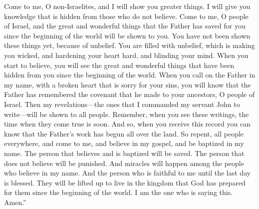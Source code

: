 Come to me, O non-Israelites, and I will show you greater things. I will give you knowledge that is hidden from those who do not believe.
\bverse \iffalse Come unto me, O ye house of Israel, and it shall be made manifest unto you how great things the Father hath laid up for you, from the foundation of the world; and it hath not come unto you, because of unbelief. \fi
Come to me, O people of Israel, and the great and wonderful things that the Father has saved for you since the beginning of the world will be shown to you. You have not been shown these things yet, because of unbelief.
\bverse \iffalse Behold, when ye shall rend that veil of unbelief which doth cause you to remain in your awful state of wickedness, and hardness of heart, and blindness of mind, then shall the great and marvelous things which have been hid up from the foundation of the world from you--yea, when ye shall call upon the Father in my name, with a broken heart and a contrite spirit, then shall ye know that the Father hath remembered the covenant which he made unto your fathers, O house of Israel. \fi
You are filled with unbelief, which is making you wicked, and hardening your heart hard, and blinding your mind. When you start to believe, you will see the great and wonderful things that have been hidden from you since the beginning of the world. When you call on the Father in my name, with a broken heart that is sorry for your sins, you will know that the Father has remembered the covenant that he made to your ancestors, O people of Israel.
\bverse \iffalse And then shall my revelations which I have caused to be written by my servant John be unfolded in the eyes of all the people. Remember, when ye see these things, ye shall know that the time is at hand that they shall be made manifest in very deed. \fi
Then my revelations---the ones that I commanded my servant John to write---will be shown to all people. Remember, when you see these writings, the time when they come true is soon.
\bverse \iffalse Therefore, when ye shall receive this record ye may know that the work of the Father has commenced upon all the face of the land. \fi
And so, when you receive this record you can know that the Father's work has begun all over the land.
\bverse \iffalse Therefore, repent all ye ends of the earth, and come unto me, and believe in my gospel, and be baptized in my name; for he that believeth and is baptized shall be saved; but he that believeth not shall be damned; and signs shall follow them that believe in my name. \fi
So repent, all people everywhere, and come to me, and believe in my gospel, and be baptized in my name. The person that believes and is baptized will be saved. The person that does not believe will be punished. And miracles will happen among the people who believe in my name.
\bverse \iffalse And blessed is he that is found faithful unto my name at the last day, for he shall be lifted up to dwell in the kingdom prepared for him from the foundation of the world. And behold it is I that hath spoken it. Amen. \fi
And the person who is faithful to me until the last day is blessed. They will be lifted up to live in the kingdom that God has prepared for them since the beginning of the world. I am the one who is saying this. Amen.''

